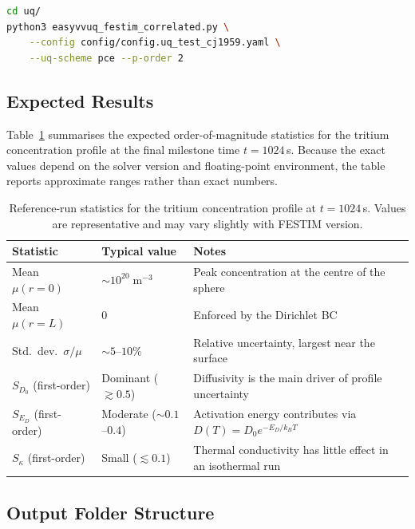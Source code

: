 \documentclass[11pt,a4paper]{article}
\begin{document}
\begin{lstlisting}[language=bash]
cd uq/
python3 easyvvuq_festim_correlated.py \
    --config config/config.uq_test_cj1959.yaml \
    --uq-scheme pce --p-order 2
\end{lstlisting}

\subsection{Expected Results}
\label{sec:refrun:results}

Table~\ref{tab:refrun} summarises the expected order-of-magnitude
statistics for the tritium concentration profile at the final milestone
time $t = 1024$\,s.  Because the exact values depend on the solver
version and floating-point environment, the table reports approximate
ranges rather than exact numbers.

\begin{table}[htbp]
\centering
\caption{Reference-run statistics for the tritium concentration profile
  at $t = 1024$\,s.  Values are representative and may vary slightly
  with FESTIM version.}
\label{tab:refrun}
\small
\begin{tabularx}{\textwidth}{@{} l l X @{}}
\toprule
\textbf{Statistic} & \textbf{Typical value} & \textbf{Notes} \\
\midrule
Mean $\mu(r\!=\!0)$
  & $\sim 10^{20}\;\mathrm{m^{-3}}$
  & Peak concentration at the centre of the sphere \\
Mean $\mu(r\!=\!L)$
  & $0$
  & Enforced by the Dirichlet BC \\
Std.\ dev.\ $\sigma / \mu$
  & $\sim 5$--$10\%$
  & Relative uncertainty, largest near the surface \\
\midrule
$S_{D_0}$ (first-order)
  & Dominant ($\gtrsim 0.5$)
  & Diffusivity is the main driver of profile uncertainty \\
$S_{E_D}$ (first-order)
  & Moderate ($\sim 0.1$--$0.4$)
  & Activation energy contributes via $D(T) = D_0 e^{-E_D/k_B T}$ \\
$S_{\kappa}$ (first-order)
  & Small ($\lesssim 0.1$)
  & Thermal conductivity has little effect in an isothermal run \\
\bottomrule
\end{tabularx}
\end{table}

\subsection{Output Folder Structure}
\end{document}
